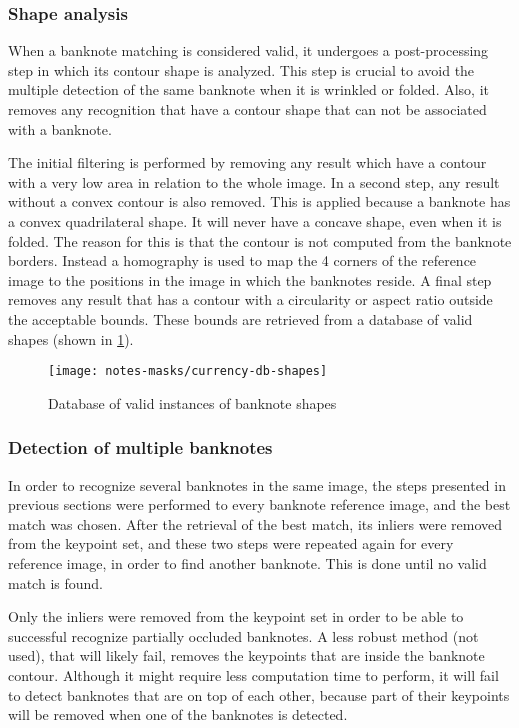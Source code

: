 \subsubsection{Shape analysis}\label{sec:shape-analysis}

When a banknote matching is considered valid, it undergoes a post-processing step in which its contour shape is analyzed. This step is crucial to avoid the multiple detection of the same banknote when it is wrinkled or folded. Also, it removes any recognition that have a contour shape that can not be associated with a banknote.

The initial filtering is performed by removing any result which have a contour with a very low area in relation to the whole image. In a second step, any result without a convex contour is also removed. This is applied because a banknote has a convex quadrilateral shape. It will never have a concave shape, even when it is folded. The reason for this is that the contour is not computed from the banknote borders. Instead a homography is used to map the 4 corners of the reference image to the positions in the image in which the banknotes reside. A final step removes any result that has a contour with a circularity or aspect ratio outside the acceptable bounds. These bounds are retrieved from a database of valid shapes (shown in \cref{fig:currency-db-shapes}).

\begin{figure}
	\centering
	\texttt{[image: notes-masks/currency-db-shapes]}
	\caption{Database of valid instances of banknote shapes}
	\label{fig:currency-db-shapes}
\end{figure}


\subsubsection{Detection of multiple banknotes}

In order to recognize several banknotes in the same image, the steps presented in previous sections were performed to every banknote reference image, and the best match was chosen. After the retrieval of the best match, its inliers were removed from the keypoint set, and these two steps were repeated again for every reference image, in order to find another banknote. This is done until no valid match is found.

Only the inliers were removed from the keypoint set in order to be able to successful recognize partially occluded banknotes. A less robust method (not used), that will likely fail, removes the keypoints that are inside the banknote contour. Although it might require less computation time to perform, it will fail to detect banknotes that are on top of each other, because part of their keypoints will be removed when one of the banknotes is detected.
